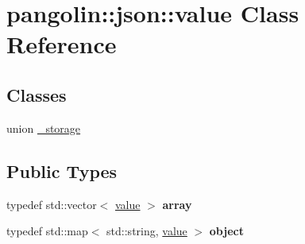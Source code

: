 \hypertarget{classpangolin_1_1json_1_1value}{}\section{pangolin\+:\+:json\+:\+:value Class Reference}
\label{classpangolin_1_1json_1_1value}
\subsection*{Classes}
\begin{DoxyCompactItemize}
\item 
union \hyperlink{unionpangolin_1_1json_1_1value_1_1__storage}{\+\_\+storage}
\end{DoxyCompactItemize}
\subsection*{Public Types}
\begin{DoxyCompactItemize}
\item 
typedef std\+::vector$<$ \hyperlink{classpangolin_1_1json_1_1value}{value} $>$ {\bfseries array}\hypertarget{classpangolin_1_1json_1_1value_a3b2da03c1d45779ad4035f4178ccd804}{}\label{classpangolin_1_1json_1_1value_a3b2da03c1d45779ad4035f4178ccd804}

\item 
typedef std\+::map$<$ std\+::string, \hyperlink{classpangolin_1_1json_1_1value}{value} $>$ {\bfseries object}\hypertarget{classpangolin_1_1json_1_1value_a6dd5198699e330c2c8b5564c99586cc1}{}\label{classpangolin_1_1json_1_1value_a6dd5198699e330c2c8b5564c99586cc1}

\end{DoxyCompactItemize}

